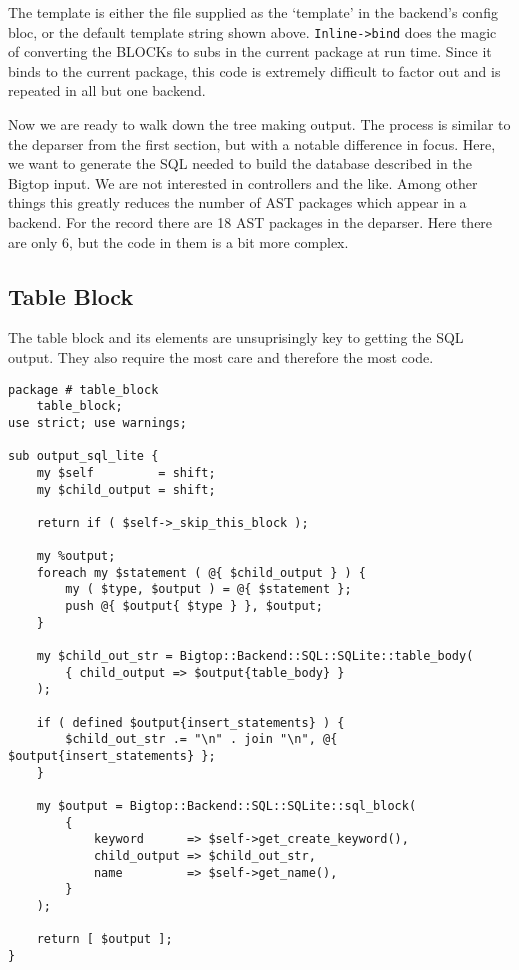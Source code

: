 The template is either the file supplied as the `template' in the backend's
config bloc, or the default template string shown above.  \verb+Inline->bind+
does the magic of converting the BLOCKs to subs in the current package at run
time.  Since it binds to the current package, this code is extremely difficult
to factor out and is repeated in all but one backend.

Now we are ready to walk down the tree making output.  The process is
similar to the deparser from the first section, but with a notable difference
in focus.  Here, we want to generate the SQL needed to build the database
described in the Bigtop input.  We are not interested in controllers and the
like.  Among other things this greatly reduces the number of AST packages
which appear in a backend.  For the record there are 18 AST packages in the
deparser.  Here there are only 6, but the code in them is a bit more complex.

\subsection*{Table Block}

The table block and its elements are unsuprisingly key to getting the SQL
output.  They also require the most care and therefore the most code.

\begin{verbatim}
package # table_block
    table_block;
use strict; use warnings;

sub output_sql_lite {
    my $self         = shift;
    my $child_output = shift;

    return if ( $self->_skip_this_block );

    my %output;
    foreach my $statement ( @{ $child_output } ) {
        my ( $type, $output ) = @{ $statement };
        push @{ $output{ $type } }, $output;
    }

    my $child_out_str = Bigtop::Backend::SQL::SQLite::table_body(
        { child_output => $output{table_body} }
    );

    if ( defined $output{insert_statements} ) {
        $child_out_str .= "\n" . join "\n", @{ $output{insert_statements} };
    }

    my $output = Bigtop::Backend::SQL::SQLite::sql_block(
        {
            keyword      => $self->get_create_keyword(),
            child_output => $child_out_str,
            name         => $self->get_name(),
        }
    );

    return [ $output ];
}
\end{verbatim}

